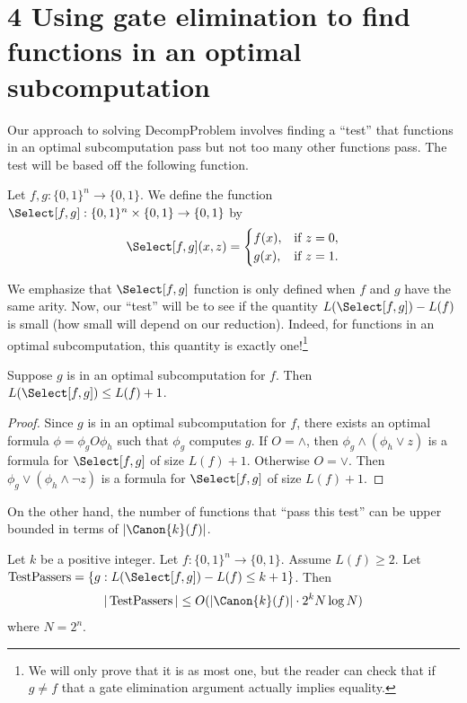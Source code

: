\section*{4 Using gate elimination to find functions in an optimal subcomputation}
Our approach to solving DecompProblem involves finding a ``test'' that functions in an optimal subcomputation pass but not too many other functions pass. The test will be based off the following function.
\setcounter{nttheorem}{21}
\begin{ntdefinition}
Let $f,g:\{0,1\}^n\to\{0,1\}$. We define the function $\Select[f,g]:\{0,1\}^n\times\{0,1\}\to\{0,1\}$ by
\[\Select[f,g](x,z)=\begin{cases}f(x),&\text{if }z=0,\\g(x),&\text{if }z=1.\end{cases}\]
\end{ntdefinition}
We emphasize that $\Select[f,g]$ function is only defined when $f$ and $g$ have the same arity.
Now, our ``test'' will be to see if the quantity $L(\Select[f,g])-L(f)$ is small (how small will depend on our reduction).
Indeed, for functions in an optimal subcomputation, this quantity is exactly one!\footnote{We will only prove that it is as most one, but the reader can check that if $g\ne f$ that a gate elimination argument actually implies equality.}
\begin{ntlemma}
Suppose $g$ is in an optimal subcomputation for $f$. Then $L(\Select[f,g])\leq L(f)+1$.
\end{ntlemma}
\begin{proof}
Since $g$ is in an optimal subcomputation for $f$, there exists an optimal formula $\phi=\phi_gO\phi_h$ such that $\phi_g$ computes $g$. If $O=\land$, then $\phi_g\land(\phi_h\lor z)$ is a formula for $\Select[f,g]$ of size $L(f)+1$. Otherwise $O=\lor$. Then $\phi_g\lor(\phi_h\land\neg z)$ is a formula for $\Select[f,g]$ of size $L(f)+1$.
\end{proof}
On the other hand, the number of functions that ``pass this test'' can be upper bounded in terms of $|\Canon{k}(f)|$.
\begin{ntlemma}
Let $k$ be a positive integer. Let $f:\{0,1\}^n\to\{0,1\}$. Assume $L(f)\geq 2$. Let $\operatorname{TestPassers}=\{g:L(\Select[f,g])-L(f)\leq k+1\}$. Then
\[|\operatorname{TestPassers}|\leq O(|\Canon{k}(f)|\cdot 2^kN\log N)\]
where $N=2^n$.
\end{ntlemma}
